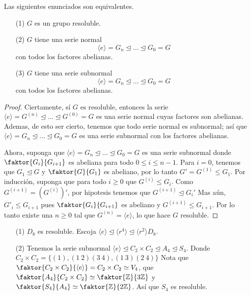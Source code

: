 \begin{theorem}\label{11.51}
    Las siguientes enunciados son equivalentes.
    \begin{enumerate}
        \item[(1)] $G$ es un grupo resoluble.

        \item[(2)] $G$ tiene una serie normal
            \begin{equation*}
                \langle e \rangle=G_n \unlhd \dots \unlhd G_0=G
            \end{equation*}
            con todos los factores abelianas.

        \item[(3)] $G$ tiene una serie subnormal
            \begin{equation*}
                \langle e \rangle=G_n \unlhd \dots \unlhd G_0=G
            \end{equation*}
            con todos los factores abelianas.
    \end{enumerate}
\end{theorem}
\begin{proof}
    Ciertamente, s\'i $G$ es resoluble, entonces la serie $\langle e
    \rangle=G^{(n)} \unlhd \dots \unlhd G^{(0)}=G$ es una serie normal cuyas
    factores son abelianas. Ademas, de esto ser cierto, tenemos que todo serie
    normal es subnormal; as\'i que $\langle e \rangle=G_n \unlhd \dots \unlhd
    G_0=G$ es una serie subnormal con los factores abelianas.

    Ahora, suponga que $\langle e \rangle=G_n \unlhd \dots \unlhd G_0=G$ es una
    serie subnormal donde $\faktor{G_i}{G_{i+1}}$ es abeliana para todo $0 \leq
    i \leq n-1$. Para  $i=0$, tenemos que  $G_1 \unlhd G$ y  $\faktor{G}{G_1}$
    es abeliano, por lo tanto $G'=G^{(1)} \leq G_1$. Por inducci\'on, suponga
    que para todo $i \geq 0$ que  $G^{(i)} \leq G_i$. Como
    $G^{(i+1)}=(G^{(i)})'$, por hipotesis tenemos que $G^{(i+1)} \unlhd G_i'$
    Mas a\'un, $G'_i \leq G_{i+1}$ pues $\faktor{G_i}{G_{i+1}}$ es abeliano y
    $G^{(i+1)} \leq G_{i+1}$. Por lo tanto existe una $n \geq 0$ tal que
    $G^{(n)}=\langle e \rangle$, lo que hace $G$ resoluble.
\end{proof}

\begin{example}\label{}
    \begin{enumerate}
        \item[(1)] $D_8$ es resoluble. Escoja $\langle e \rangle \unlhd
            \langle r^4 \rangle \unlhd \langle r^2 \rangle D_8$.

        \item[(2)] Tenemos la serie subnormal $\langle e \rangle \unlhd C_2
            \times C_2 \unlhd A_4 \unlhd S_4$. Donde $C_2 \times C_2=\{(1), (1 \
            2)(3 \ 4), (1 \ 3)(2 \ 4)\}$ Nota que $\faktor{C_2 \times
            C_2}{\langle e \rangle}=C_2 \times C_2 \simeq V_4$, que
            $\faktor{A_4}{C_2 \times C_2} \simeq \faktor{\Z}{3\Z}$ y
            $\faktor{S_4}{A_4} \simeq \faktor{\Z}{2\Z}$. As\'i que $S_4$ es
            resoluble.
    \end{enumerate}
\end{example}
